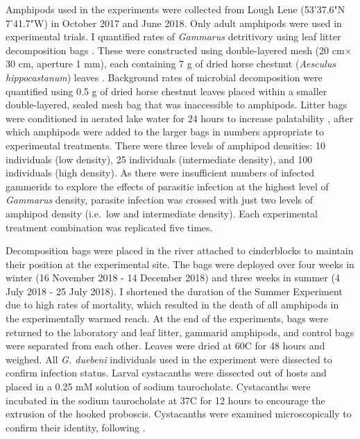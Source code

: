 Amphipods used in the experiments were collected from Lough Lene (53'37.6"N 7'41.7"W) in October 2017 and June 2018. Only adult amphipods were used in experimental trials. I quantified rates of \emph{Gammarus} detritivory using leaf litter decomposition bags \citep{benfield2006}. These were constructed using double-layered mesh (20 cm$\times$30 cm, aperture 1 mm), each containing 7 g of dried horse chestnut (\emph{Aesculus hippocastanum}) leaves \citep{agatz2014}. Background rates of microbial decomposition were quantified using 0.5 g of dried horse chestnut leaves placed within a smaller double-layered, sealed mesh bag that was inaccessible to amphipods. Litter bags were conditioned in aerated lake water for 24 hours to increase palatability \citep{graca1993, agatz2014}, after which amphipods were added to the larger bags in numbers appropriate to experimental treatments. There were three levels of amphipod densities: 10 individuals (low density), 25 individuals (intermediate density), and 100 individuals (high density). As there were insufficient numbers of infected gammerids to explore the effects of parasitic infection at the highest level of \emph{Gammarus} density, parasite infection was crossed with just two levels of amphipod density (i.e.\ low and intermediate density). Each experimental treatment combination was replicated five times.

Decomposition bags were placed in the river attached to cinderblocks to maintain their position at the experimental site. The bags were deployed over four weeks in winter (16 November 2018 - 14 December 2018) and three weeks in summer (4 July 2018 - 25 July 2018). I shortened the duration of the Summer Experiment due to high rates of mortality, which resulted in the death of all amphipods in the experimentally warmed reach. At the end of the experiments, bags were returned to the laboratory and leaf litter, gammarid amphipods, and control bags were separated from each other. Leaves were dried at 60\degree C for 48 hours and weighed. All \emph{G. duebeni} individuals used in the experiment were dissected to confirm infection status. Larval cystacanths were dissected out of hosts and placed in a 0.25 mM solution of sodium taurocholate. Cystacanths were incubated in the sodium taurocholate at 37\degree C for 12 hours to encourage the extrusion of the hooked proboscis. Cystacanths were examined microscopically to confirm their identity, following \citet{mcdonald1988}.

